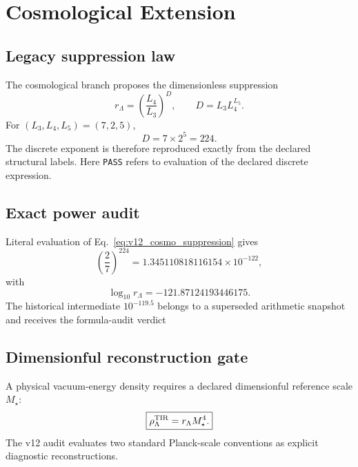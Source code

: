 
\chapter{Cosmological Extension}
\label{ch:v12_cosmology}

\section{Legacy suppression law}

The cosmological branch proposes the dimensionless suppression
\begin{equation}
\boxed{
r_\Lambda
=\left(\frac{L_4}{L_3}\right)^D,
\qquad
D=L_3L_4^{L_5}.
}
\label{eq:v12_cosmo_suppression}
\end{equation}
For $(L_3,L_4,L_5)=(7,2,5)$,
\begin{equation}
D=7\times2^5=224.
\end{equation}
The discrete exponent is therefore reproduced exactly from the declared structural labels.
Here \texttt{PASS} refers to evaluation of the declared discrete expression.

\section{Exact power audit}

Literal evaluation of Eq.~\eqref{eq:v12_cosmo_suppression} gives
\begin{equation}
\boxed{
\left(\frac27\right)^{224}
=1.345110818116154\times10^{-122},
}
\label{eq:v12_cosmo_power}
\end{equation}
with
\begin{equation}
\log_{10}r_\Lambda=-121.87124193446175.
\end{equation}
The historical intermediate $10^{-119.5}$ belongs to a superseded arithmetic snapshot and receives the formula-audit verdict

\section{Dimensionful reconstruction gate}

A physical vacuum-energy density requires a declared dimensionful reference scale $M_\star$:
\begin{equation}
\boxed{
\rho_\Lambda^{\rm TIR}
=r_\Lambda M_\star^4.
}
\label{eq:v12_cosmo_dimensional}
\end{equation}
The v12 audit evaluates two standard Planck-scale conventions as explicit diagnostic reconstructions.

